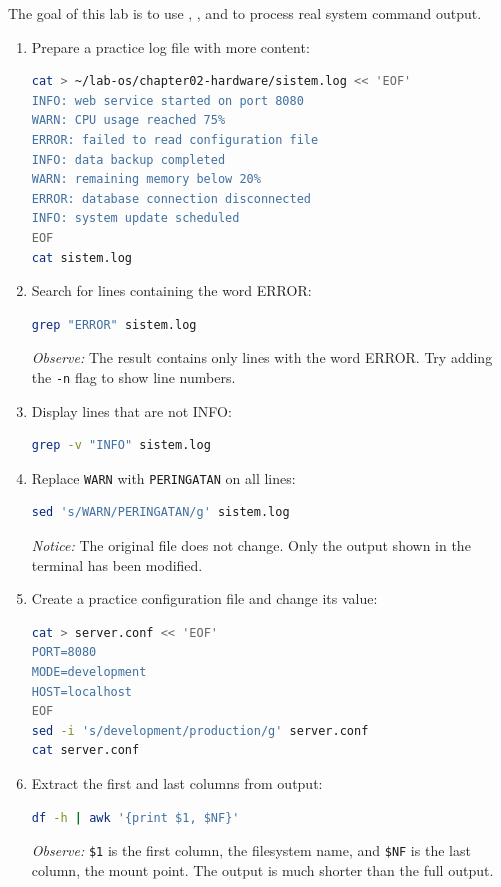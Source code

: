 The goal of this lab is to use , , and  to process real system command output.

\begin{enumerate}
    \item Prepare a practice log file with more content:
\begin{lstlisting}[language=bash, caption={Creating a practice log file}]
cat > ~/lab-os/chapter02-hardware/sistem.log << 'EOF'
INFO: web service started on port 8080
WARN: CPU usage reached 75%
ERROR: failed to read configuration file
INFO: data backup completed
WARN: remaining memory below 20%
ERROR: database connection disconnected
INFO: system update scheduled
EOF
cat sistem.log
\end{lstlisting}

    \item Search for lines containing the word ERROR:
\begin{lstlisting}[language=bash, caption={Filtering ERROR lines}]
grep "ERROR" sistem.log
\end{lstlisting}
    \textit{Observe:} The result contains only lines with the word ERROR. Try adding the \texttt{-n} flag to show line numbers.

    \item Display lines that are not INFO:
\begin{lstlisting}[language=bash, caption={Displaying lines other than INFO}]
grep -v "INFO" sistem.log
\end{lstlisting}

    \item Replace \texttt{WARN} with \texttt{PERINGATAN} on all lines:
\begin{lstlisting}[language=bash, caption={Text substitution with sed}]
sed 's/WARN/PERINGATAN/g' sistem.log
\end{lstlisting}
    \textit{Notice:} The original file does not change. Only the output shown in the terminal has been modified.

    \item Create a practice configuration file and change its value:
\begin{lstlisting}[language=bash, caption={Editing configuration with sed}]
cat > server.conf << 'EOF'
PORT=8080
MODE=development
HOST=localhost
EOF
sed -i 's/development/production/g' server.conf
cat server.conf
\end{lstlisting}

    \item Extract the first and last columns from  output:
\begin{lstlisting}[language=bash, caption={Extracting columns with awk}]
df -h | awk '{print $1, $NF}'
\end{lstlisting}
    \textit{Observe:} \texttt{\$1} is the first column, the filesystem name, and \texttt{\$NF} is the last column, the mount point. The output is much shorter than the full  output.


\end{enumerate}
